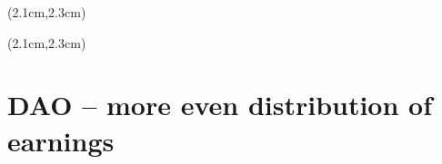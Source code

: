 \begin{preview}
\begin{textblock*}{5cm}(2.1cm,2.3cm) %
{\color{red}{\large \textcircled{\small \themypage}}}
\addtocounter{mypage}{1}
\end{textblock*}

\begin{minipage}{\textwidth}
\setlength{\parskip}{0.4\baselineskip}


\end{minipage}
\end{preview}

\begin{preview}
\begin{textblock*}{5cm}(2.1cm,2.3cm) %
	{\color{red}{\large \textcircled{\small \themypage}}}
	\addtocounter{mypage}{1}
\end{textblock*}

\begin{minipage}{\textwidth}
	\setlength{\parskip}{0.4\baselineskip}

\section{DAO -- more even distribution of earnings}

\end{minipage}
\end{preview}


